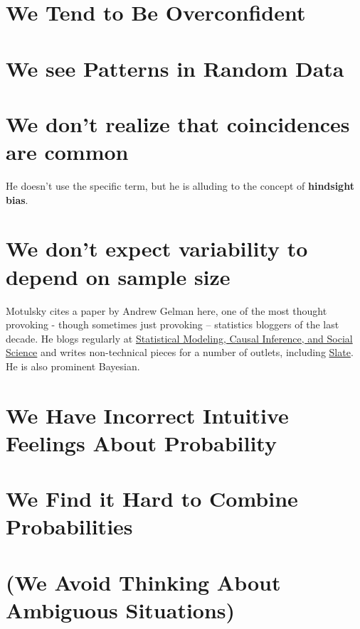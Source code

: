 \documentclass[]{book}
\theoremstyle{definition}
\theoremstyle{definition}
\theoremstyle{definition}
\theoremstyle{remark}
\begin{document}
\section{We Tend to Be Overconfident}\label{we-tend-to-be-overconfident}

\section{We see Patterns in Random
Data}\label{we-see-patterns-in-random-data}

\section{We don't realize that coincidences are
common}\label{we-dont-realize-that-coincidences-are-common}

He doesn't use the specific term, but he is alluding to the concept of
\textbf{hindsight bias}.

\section{We don't expect variability to depend on sample
size}\label{we-dont-expect-variability-to-depend-on-sample-size}

Motulsky cites a paper by Andrew Gelman here, one of the most thought
provoking - though sometimes just provoking -- statistics bloggers of
the last decade. He blogs regularly at
\href{http://andrewgelman.com/}{Statistical Modeling, Causal Inference,
and Social Science} and writes non-technical pieces for a number of
outlets, including
\href{http://www.slate.com/authors.andrew_gelman.html}{Slate}. He is
also prominent Bayesian.

\section{We Have Incorrect Intuitive Feelings About
Probability}\label{we-have-incorrect-intuitive-feelings-about-probability}

\section{We Find it Hard to Combine
Probabilities}\label{we-find-it-hard-to-combine-probabilities}

\section{(We Avoid Thinking About Ambiguous
Situations)}\label{we-avoid-thinking-about-ambiguous-situations}
\end{document}

